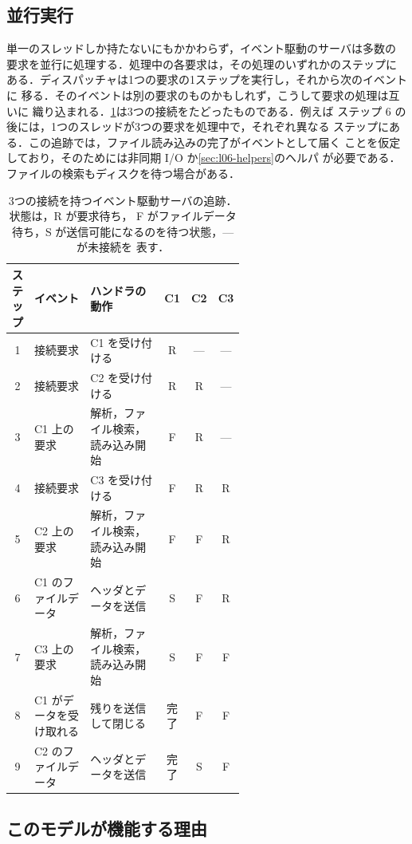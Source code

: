 \documentclass[../main.tex]{subfiles}
\begin{document}
\subsection{並行実行}

単一のスレッドしか持たないにもかかわらず，イベント駆動のサーバは多数の
要求を並行に処理する．処理中の各要求は，その処理のいずれかのステップに
ある．ディスパッチャは1つの要求の1ステップを実行し，それから次のイベントに
移る．そのイベントは別の要求のものかもしれず，こうして要求の処理は互いに
織り込まれる．\cref{tab:l06-trace}は3つの接続をたどったものである．例えば
ステップ 6 の後には，1つのスレッドが3つの要求を処理中で，それぞれ異なる
ステップにある．この追跡では，ファイル読み込みの完了がイベントとして届く
ことを仮定しており，そのためには非同期 I/O か\cref{sec:l06-helpers}のヘルパ
が必要である．ファイルの検索もディスクを待つ場合がある．

\begin{table}[htbp]
  \centering
  \caption{3つの接続を持つイベント駆動サーバの追跡．状態は，R が要求待ち，
    F がファイルデータ待ち，S が送信可能になるのを待つ状態，--- が未接続を
    表す．}
  \label{tab:l06-trace}
  \small
  \begin{tabular}{@{}c>{\raggedright\arraybackslash}p{0.25\linewidth}>{\raggedright\arraybackslash}p{0.33\linewidth}ccc@{}}
    \toprule
    ステップ & イベント & ハンドラの動作 & C1 & C2 & C3 \\
    \midrule
    1 & 接続要求 & C1 を受け付ける & R & --- & --- \\
    2 & 接続要求 & C2 を受け付ける & R & R & --- \\
    3 & C1 上の要求 & 解析，ファイル検索，読み込み開始 & F & R & --- \\
    4 & 接続要求 & C3 を受け付ける & F & R & R \\
    5 & C2 上の要求 & 解析，ファイル検索，読み込み開始 & F & F & R \\
    6 & C1 のファイルデータ & ヘッダとデータを送信 & S & F & R \\
    7 & C3 上の要求 & 解析，ファイル検索，読み込み開始 & S & F & F \\
    8 & C1 がデータを受け取れる & 残りを送信して閉じる & 完了 & F & F \\
    9 & C2 のファイルデータ & ヘッダとデータを送信 & 完了 & S & F \\
    \bottomrule
  \end{tabular}
\end{table}

\subsection{このモデルが機能する理由}
\end{document}
